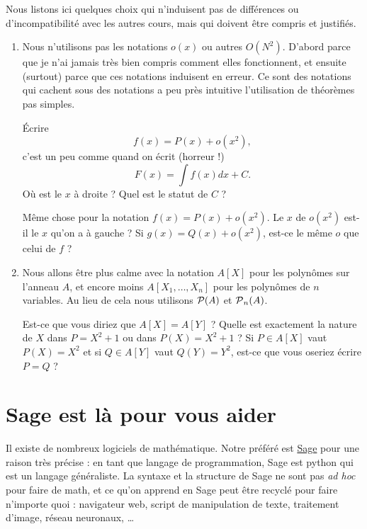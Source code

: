 Nous listons ici quelques choix qui n'induisent pas de différences ou d'incompatibilité avec les autres cours, mais qui doivent être compris et justifiés.

\begin{enumerate}
    \item
        Nous n'utilisons pas les notations \( o(x)\) ou autres \( O(N^2)\). D'abord parce que je n'ai jamais très bien compris comment elles fonctionnent, et ensuite (surtout) parce que ces notations induisent en erreur. Ce sont des notations qui cachent sous des notations a peu près intuitive l'utilisation de théorèmes pas simples.

        Écrire
        \begin{equation}
            f(x)=P(x)+o(x^2),
        \end{equation}
        c'est un peu comme quand on écrit (horreur !)
        \begin{equation}
            F(x)=\int f(x)dx+C.
        \end{equation}
        Où est le \( x\) à droite ? Quel est le statut de \( C \) ? 

        Même chose pour la notation \( f(x)=P(x)+o(x^2)\). Le \( x\) de \( o(x^2)\) est-il le \( x\) qu'on a à gauche ? Si \( g(x)=Q(x)+o(x^2)\), est-ce le même \( o\) que celui de \( f\) ?
    \item
        Nous allons être plus calme avec la notation \( A[X]\) pour les polynômes sur l'anneau \( A\), et encore moins \( A[X_1,\ldots, X_n]\) pour les polynômes de \( n\) variables. Au lieu de cela nous utilisons \( \operatorname{\mathcal{P}}(A)\) et \( \operatorname{\mathcal{P}}_n(A)\).

        Est-ce que vous diriez que \( A[X]=A[Y]\) ? Quelle est exactement la nature de \( X\) dans \( P=X^2+1\) ou dans \( P(X)=X^2+1\) ? Si \( P\in A[X]\) vaut \( P(X)=X^2\)  et si \( Q\in A[Y]\) vaut \( Q(Y)=Y^2\), est-ce que vous oseriez écrire \( P=Q\) ?
\end{enumerate}

\section{Sage est là pour vous aider}

Il existe de nombreux logiciels de mathématique. Notre préféré est \href{http://www.sagemath.org}{Sage} pour une raison très précise : en tant que langage de programmation, Sage est python qui est un langage généraliste. La syntaxe et la structure de Sage ne sont pas \emph{ad hoc} pour faire de math, et ce qu'on apprend en Sage peut être recyclé pour faire n'importe quoi : navigateur web, script de manipulation de texte, traitement d'image, réseau neuronaux, \ldots

